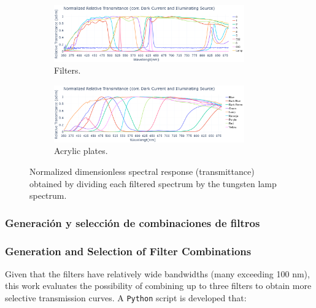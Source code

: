 \begin{figure}[h!]
    \centering
    \begin{subfigure}{\textwidth}
        \centering
        \includegraphics[trim=0mm 0mm 0mm 25mm, clip, width=0.9\textwidth]{Figures/C3/filtros_respuestaspec.png}
        \caption{Filters.}
        \label{fig:filtros_espectros}
    \end{subfigure}
    \vspace{1em}
    \begin{subfigure}{\textwidth}
        \centering
        \includegraphics[trim=0mm 0mm 0mm 25mm, clip, width=0.9\textwidth]{Figures/C3/laminas_respuestaspec.png}
        \caption{Acrylic plates.}
        \label{fig:laminas_espectros}
    \end{subfigure}
    \caption{Normalized dimensionless spectral response (transmittance) obtained by dividing each filtered spectrum by the tungsten lamp spectrum.}
    \label{ig:filtros_laminas_espectros_relativos}
\end{figure}

\subsubsection{Generación y selección de combinaciones de filtros}
\label{subsub:combinaciones_filtros}

\subsubsection{Generation and Selection of Filter Combinations}
\label{subsub:combinaciones_filtros}

Given that the filters have relatively wide bandwidths (many exceeding 100 nm), this work evaluates the possibility of combining up to three filters to obtain more selective transmission curves. A \texttt{Python} script is developed that:

